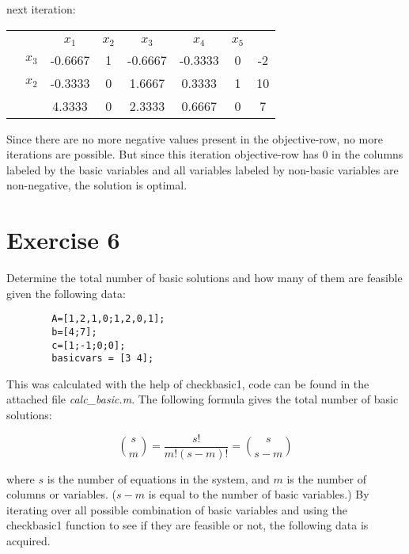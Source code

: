 \documentclass{article}
\begin{document}
    next iteration:

    \begin{center}
        \begin{tabular}{ c | c | c c c c c | c | }
            \multicolumn{1}{c}{}  & \multicolumn{1}{c}{}  &    & &     & \multicolumn{1}{c}{}\\
            \cline{2-8}
            &  & $x_1$ & $x_2$ & $x_3$ & $x_4$ & $x_5$ &\\
            \cline{2-8}
            & $x_3$ & -0.6667& 1& -0.6667& -0.3333& 0& -2\\
            & $x_2$ & -0.3333& 0& 1.6667& 0.3333& 1& 10\\
            \cline{2-8}
            & & 4.3333 & 0& 2.3333& 0.6667& 0& 7\\
            \cline{2-8}
        \end{tabular}
    \end{center}

    Since there are no more negative values present in the objective-row, no
    more iterations are possible. But since this iteration objective-row has 0
    in the columns labeled by the basic variables and all variables labeled by
    non-basic variables are non-negative, the solution is optimal.

\section*{Exercise 6}

    Determine the total number of basic solutions and how many of them are
    feasible given the following data:

    \begin{lstlisting}
        A=[1,2,1,0;1,2,0,1];
        b=[4;7];
        c=[1;-1;0;0];
        basicvars = [3 4];
    \end{lstlisting}

    \noindent
    This was calculated with the help of checkbasic1, code can be found in the
    attached file \textit{calc\_basic.m}.
    The following formula gives the total number of basic solutions:

    \begin{equation}
        \binom{s}{m} = \frac{s!}{m!(s - m)!} = \binom{s}{s-m}
    \end{equation}

    \noindent
    where $s$ is the number of equations in the system, and $m$ is the number
    of columns or variables. ($s - m$ is equal to the number of
    basic variables.) By iterating over all possible combination of basic
    variables and using the checkbasic1 function to see if they are feasible or
    not, the following data is acquired. \\
\end{document}
